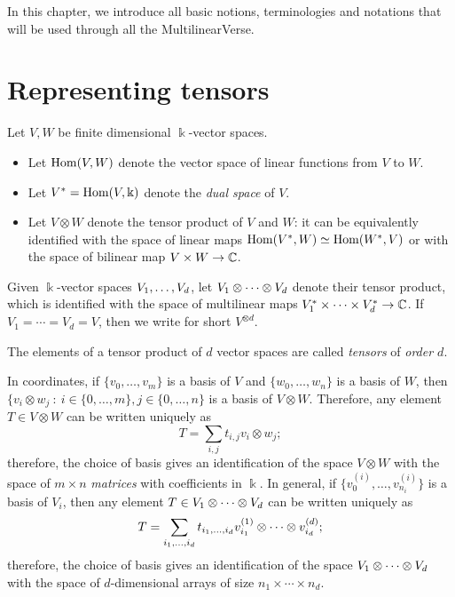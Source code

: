 In this chapter, we introduce all basic notions, terminologies and notations that will be used through all the MultilinearVerse. 

\section{Representing tensors}
\label{introduction-section-representingtensors}

\begin{definition}\label{introduction-definition-tensor_product}
Let $V,W$ be finite dimensional $\Bbbk$-vector spaces.
\begin{itemize}
    \item Let $\operatorname{Hom}(V,W)$ denote the vector space of linear functions from $V$ to $W$.
    \item Let $V^* = \operatorname{Hom}(V,\Bbbk)$ denote the \emph{dual space} of $V$.
    \item Let $V \otimes W$ denote the tensor product of $V$ and $W$: it can be equivalently identified with the space of linear maps $\operatorname{Hom}(V^*,W) \simeq \operatorname{Hom}(W^*,V)$ or with the space of bilinear map $V \times W \to \mathbb{C}$.
\end{itemize}
Given $\Bbbk$-vector spaces $V_1 , \ldots , V_d$, let $V_1 \otimes \cdots \otimes V_d$ denote their tensor product, which is identified with the space of multilinear maps $V_1^* \times \cdots \times V_d^* \to \mathbb{C}$. If $V_1 = \cdots = V_d = V$, then we write for short $V^{\otimes d}$. 

The elements of a tensor product of $d$ vector spaces are called \emph{tensors} of \emph{order $d$}.

In coordinates, if $\{v_0,\ldots,v_m\}$ is a basis of $V$ and $\{w_0,\ldots,w_n\}$ is a basis of $W$, then $\{v_i \otimes w_j ~:~ i \in \{0,\ldots,m\}, j \in \{0,\ldots,n\}$ is a basis of $V\otimes W$. Therefore, any element $T \in V\otimes W$ can be written uniquely as 
\[
    T = \sum_{i,j} t_{i,j}v_i\otimes w_j;
\]
therefore, the choice of basis gives an identification of the space $V\otimes W$ with the space of $m\times n$ \emph{matrices} with coefficients in $\Bbbk$. In general, if $\{v_0^{(i)},\ldots,v_{n_i}^{(i)}\}$ is a basis of $V_i$, then any element $T \in V_1 \otimes \cdots \otimes V_d$ can be written uniquely as 
\[
    T = \sum_{i_1,\ldots,i_d} t_{i_1,\ldots,i_d}v_{i_1}^{(1)}\otimes \cdots \otimes v_{i_d}^{(d)};
\]
therefore, the choice of basis gives an identification of the space $V_1 \otimes \cdots \otimes V_d$ with the space of $d$-dimensional arrays of size $n_1 \times\cdots\times n_d$. 
\end{definition}

